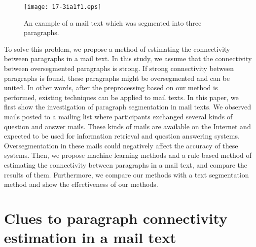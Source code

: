 \documentclass[english]{jnlp_1.4}
\begin{document}
\begin{figure}[t]
\begin{center}
\texttt{[image: 17-3ia1f1.eps]}
\end{center}
\caption{An example of a mail text which was segmented into three paragraphs.}
\label{fig:An example of a mail text which was segmented into three paragraph}
\vspace{1\baselineskip}
\end{figure}

To solve this problem,
we propose 
a method of estimating the connectivity between paragraphs in a mail text. 
In this study, 
we assume that 
the connectivity between oversegmented paragraphs is strong.
If strong connectivity between paragraphs is found, 
these paragraphs 
might be oversegmented and can be united.
In other words,
after the preprocessing based on our method is performed, 
existing techniques 
can be applied to mail texts.
In this paper, 
we first show the investigation of paragraph segmentation in mail texts. 
We observed mails posted to a mailing list 
where participants exchanged several kinds of question and answer mails.
These kinds of mails are available on the Internet and 
expected to be used for information retrieval and question answering systems.
Oversegmentation in these mails could negatively affect 
the accuracy of these systems.
Then, 
we propose 
machine learning methods and a rule-based method 
of estimating the connectivity between paragraphs in a mail text, 
and compare the results of them.
Furthermore, 
we compare our methods with a text segmentation method and
show the effectiveness of our methods.





\section{Clues to paragraph connectivity estimation in a mail text}
\label{sec:Clues to paragraph connectivity estimation in a mail text}
\end{document}
